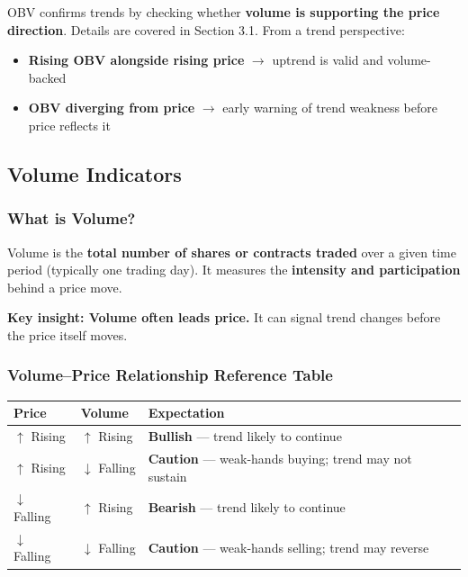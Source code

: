 \documentclass[12pt,openany]{book}
\begin{document}
OBV confirms trends by checking whether \textbf{volume is supporting the price direction}. Details are covered in Section 3.1. From a trend perspective:
\begin{itemize}[leftmargin=*]
    \item \textbf{Rising OBV alongside rising price} \(\rightarrow\) uptrend is valid and volume-backed
    \item \textbf{OBV diverging from price} \(\rightarrow\) early warning of trend weakness before price reflects it
\end{itemize}

\subsection{Volume Indicators}

\subsubsection{What is Volume?}

Volume is the \textbf{total number of shares or contracts traded} over a given time period (typically one trading day). It measures the \textbf{intensity and participation} behind a price move.

\textbf{Key insight: Volume often leads price.} It can signal trend changes before the price itself moves.

\subsubsection{Volume--Price Relationship Reference Table}

\begin{center}
\small
\renewcommand{\arraystretch}{1.2}
\begin{tabular}{|L{0.25\textwidth}|L{0.34\textwidth}|L{0.31\textwidth}|}
\hline
 \textbf{Price} & \textbf{Volume} & \textbf{Expectation} \\ \hline
 \(\uparrow\) Rising & \(\uparrow\) Rising & \textbf{Bullish} --- trend likely to continue \\ \hline
 \(\uparrow\) Rising & \(\downarrow\) Falling & \textbf{Caution} --- weak-hands buying; trend may not sustain \\ \hline
 \(\downarrow\) Falling & \(\uparrow\) Rising & \textbf{Bearish} --- trend likely to continue \\ \hline
 \(\downarrow\) Falling & \(\downarrow\) Falling & \textbf{Caution} --- weak-hands selling; trend may reverse \\ \hline
\end{tabular}
\end{center}
\end{document}
